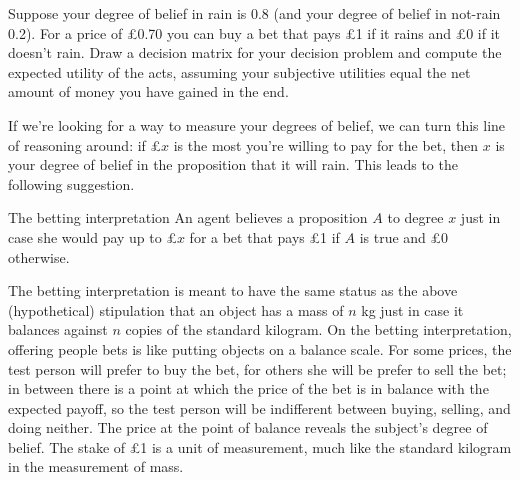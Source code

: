 \begin{exercise}{1}
  Suppose your degree of belief in rain is $0.8$ (and your degree of
  belief in not-rain 0.2). For a price of £0.70 you can buy a bet that
  pays £1 if it rains and £0 if it doesn't rain. Draw a decision
  matrix for your decision problem and compute the expected utility of
  the acts, assuming your subjective utilities equal the net amount of
  money you have gained in the end.
\end{exercise}

If we're looking for a way to measure your degrees of belief, we can
turn this line of reasoning around: if £$x$ is the most you're willing
to pay for the bet, then $x$ is your degree of belief in the
proposition that it will rain. This leads to the
following suggestion.

\begin{genericthm}{The betting interpretation}
  An agent believes a proposition $A$ to degree $x$ just in case she
  would pay up to £$x$ for a bet that pays £1 if $A$ is true and £0
  otherwise.
\end{genericthm}

The betting interpretation is meant to have the same status as the
above (hypothetical) stipulation that an object has a mass of $n$ kg
just in case it balances against $n$ copies of the standard kilogram.
On the betting interpretation, offering people bets is like putting
objects on a balance scale. For some prices, the test person will
prefer to buy the bet, for others she will be prefer to sell the bet;
in between there is a point at which the price of the bet is in
balance with the expected payoff, so the test person will be
indifferent between buying, selling, and doing neither. The price at
the point of balance reveals the subject's degree of belief. The stake
of £1 is a unit of measurement, much like the standard kilogram in the
measurement of mass.


